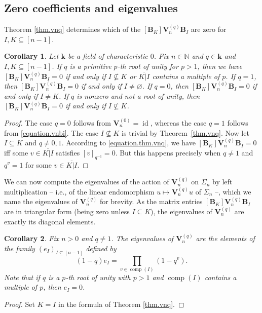 \documentclass[revision]{FPSAC2025}
\newtheorem{corollary}{Corollary}
\newcommand{\NN}{\mathbb{N}} %
\newcommand{\id}{\operatorname{id}} %
\newcommand{\VV}{\mathbf{V}} %
\newcommand{\comp}{\operatorname{comp}}
\begin{document}
\subsection{Zero coefficients and eigenvalues}
\noindent Theorem \ref{thm.vnq} determines which of the $[\mathbf{B}_K]\mathbf{V}^{(q)}_n\mathbf{B}_I$ are zero for $I, K \subseteq [n-1]$.
%
\begin{corollary}
\label{corollary.zerocoeffs}
Let $\mathbf{k}$ be a field of characteristic $0$.
Fix $n \in \NN$ and $q \in \mathbf{k}$ and $I, K \subseteq [n-1]$.
If $q$ is a primitive $p$-th root of unity for $p>1$, then we have $[\mathbf{B}_K] \mathbf{V}^{(q)}_n\mathbf{B}_I = 0$ if and only if $I \nsubseteq K$ or $\overline{K|I}$ contains a multiple of $p$.
If $q = 1$, then $[\mathbf{B}_K] \mathbf{V}^{(q)}_n\mathbf{B}_I = 0$ if and only if $I \neq \varnothing$.
If $q = 0$, then $[\mathbf{B}_K] \mathbf{V}^{(q)}_n\mathbf{B}_I = 0$ if and only if $I \neq K$.
If $q$ is nonzero and not a root of unity, then $[\mathbf{B}_K] \mathbf{V}^{(q)}_n\mathbf{B}_I = 0$ if and only if $I \nsubseteq K$.
\end{corollary}

\begin{proof}
The case $q = 0$ follows from $\VV^{(0)}_n = \id$, whereas the case $q = 1$ follows from \eqref{equation.vnbi}.
The case $I \nsubseteq K$ is trivial by Theorem~\ref{thm.vnq}.
Now let $I \subseteq K$ and $q \neq 0, 1$.
According to \eqref{equation.thm.vnq}, we have $[\mathbf{B}_K]\mathbf{V}^{(q)}_n\mathbf{B}_I = 0$ iff some $v \in \overline{ K|I}$ satisfies $[v]_{q^{-1}}=0$.
But this happens precisely when
$q \neq 1$ and $q^v = 1$ for some $v \in \overline{ K|I}$.
\end{proof}
%
We can now compute the eigenvalues of the action of $\mathbf{V}_n^{(q)}$ on $\Sigma_n$ by left multiplication -- i.e., of the linear endomorphism $u \mapsto \mathbf{V}_n^{(q)} u$ of $\Sigma_n$ --, which we name the eigenvalues of $\mathbf{V}_n^{(q)}$ for brevity. As the matrix entries $[\mathbf{B}_K]\mathbf{V}^{(q)}_n\mathbf{B}_I$ are in triangular form (being zero unless $I\subseteq K$), the eigenvalues of $\mathbf{V}_n^{(q)}$ are exactly its diagonal elements.
%
\begin{corollary}
\label{corollary.eigen}
Fix $n>0$ and $q\neq 1$. The eigenvalues of $\mathbf{V}_n^{(q)}$ are the elements of the family $(e_I)_{I \subseteq [n-1]}$ defined by
\begin{equation}
 (1-q)e_I = \prod_{v \in \comp(I)} (1-q^v).
\end{equation}
Note that if $q$ is a $p$-th root of unity with $p>1$ and $\comp(I)$ contains a multiple of $p$, then $e_I = 0$. 
\end{corollary}
\begin{proof}
Set $K=I$ in the formula of Theorem \ref{thm.vnq}.
\end{proof}
\end{document}
